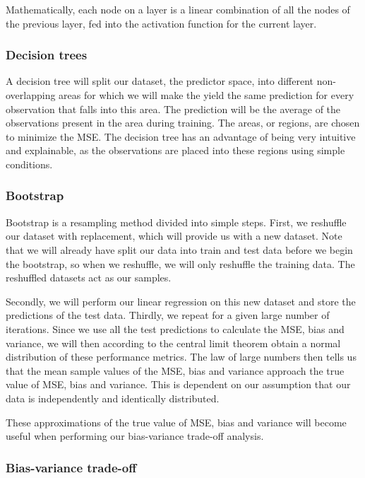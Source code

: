 \documentclass[onecolumn,10pt,cleanfoot]{asme2ej}
\begin{document}
Mathematically, each node on a layer is a linear combination of all the nodes of the previous layer, fed into the activation function for the current layer.

\subsubsection{Decision trees}
A decision tree will split our dataset, the predictor space, into different non-overlapping areas for which we will make the yield the same prediction for every observation that falls into this area. The prediction will be the average of the observations present in the area during training. The areas, or regions, are chosen to minimize the MSE. The decision tree has an advantage of being very intuitive and explainable, as the observations are placed into these regions using simple conditions.

\subsubsection{Bootstrap}

Bootstrap is a resampling method divided into simple steps. First, we reshuffle our dataset with replacement, which will provide us with a new dataset. Note that we will already have split our data into train and test data before we begin the bootstrap, so when we reshuffle, we will only reshuffle the training data. The reshuffled datasets act as our samples.

Secondly, we will perform our linear regression on this new dataset and store the predictions of the test data. Thirdly, we repeat for a given large number of iterations. Since we use all the test predictions to calculate the MSE, bias and variance, we will then according to the central limit theorem \cite{CLT} obtain a normal distribution of these performance metrics. The law of large numbers \cite{LLN} then tells us that the mean sample values of the MSE, bias and variance approach the true value of MSE, bias and variance. This is dependent on our assumption that our data is independently and identically distributed.

These approximations of the true value of MSE, bias and variance will become useful when performing our bias-variance trade-off analysis.

\subsubsection{Bias-variance trade-off}
\end{document}
